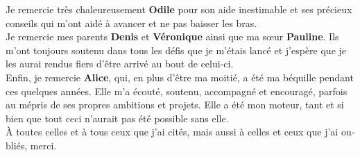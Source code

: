 \begin{otherlanguage}{french}
Je remercie très chaleureusement \textbf{Odile} pour son aide inestimable et ses
précieux conseils qui m'ont aidé à avancer et ne pas baisser les bras.\\

Je remercie mes parents \textbf{Denis} et \textbf{Véronique} ainsi que ma sœur
\textbf{Pauline}. Ils m'ont toujours soutenu dans tous les défis que je m'étais
lancé et j'espère que je les aurai rendus fiers d'être arrivé au bout de
celui-ci.\\

Enfin, je remercie \textbf{Alice}, qui, en plus d'être ma moitié, a été ma
béquille pendant ces quelques années. Elle m'a écouté, soutenu, accompagné et
encouragé, parfois au mépris de ses propres ambitions et projets. Elle a été mon
moteur, tant et si bien que tout ceci n'aurait pas été possible sans elle.\\

À toutes celles et à tous ceux que j'ai cités, mais aussi à celles et ceux que
j'ai oubliés, merci. \\

\end{otherlanguage}